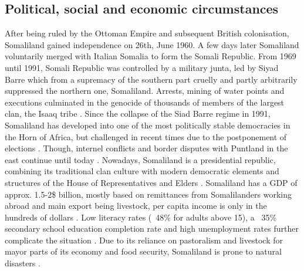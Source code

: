 


\subsection{Political, social and economic circumstances} %

After being ruled by the Ottoman Empire and subsequent British colonisation, Somaliland gained independence on 26th, June 1960. A few days later Somaliland voluntarily merged with Italian Somalia to form the Somali Republic. From 1969 until 1991, Somali Republic was controlled by a military junta, led by Siyad Barre which from a supremacy of the southern part cruelly and partly arbitrarily suppressed the northern one, Somaliland. Arrests, mining of water points and executions culminated in the genocide of thousands of members of the largest clan, the Isaaq tribe \autocite{peiferStoppingMassKillings2009,republicofsomaliaCountryProfile20212021}. Since the collapse of the Siad Barre regime in 1991, Somaliland has developed into one of the most politically stable democracies in the Horn of Africa, but challenged in recent times due to the postponement of elections \autocite{bbcSomalilandProfile2022, fortiPocketStabilityUnderstanding2011}. Though, internel conflicts and border disputes with Puntland in the east continue until today \autocite{filhoDEMOCRACYAFRICAOUTSTANDING2021}. Nowadays, Somaliland is a presidential republic, combining its traditional clan culture with modern democratic elements and structures of the House of Representatives and Elders \autocite{salemTerritorialDiagnosticReport2016}.
Somaliland has a GDP of approx. 1.5-2\$ billion, mostly based on remittances from Somalilanders working abroad and main export being livestock, per capita income is only in the hundreds of dollars \autocite{klobucistaSomalilandHornAfrica2018, republicofsomaliaCountryProfile20212021, worldbankNewWorldBank2014}. Low literacy rates (~48\% for adults above 15), a ~35\% secondary school education completion rate and high unemployment rates further complicate the situation \autocite{republicofsomaliaCountryProfile20212021,worldbankNewWorldBank2014}. Due to its reliance on pastoralism and livestock for mayor parts of its economy and food security, Somaliland is prone to natural disasters \autocite{usaidcenterforresilienceEconomicsResilienceDrought2018}.


